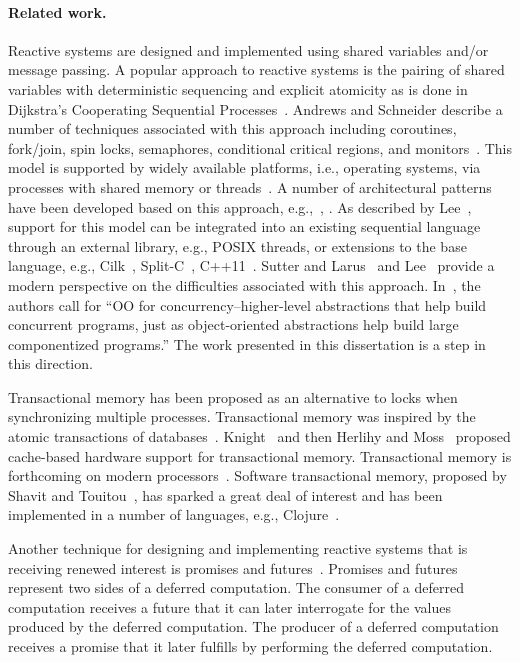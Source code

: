\paragraph{Related work.}
Reactive systems are designed and implemented using shared variables and/or message passing.
A popular approach to reactive systems is the pairing of shared variables with deterministic sequencing and explicit atomicity as is done in Dijkstra's Cooperating Sequential Processes~\cite{dijkstra1965cooperating}.
Andrews and Schneider describe a number of techniques associated with this approach including coroutines, fork/join, spin locks, semaphores, conditional critical regions, and monitors~\cite{andrews1983concepts}.
This model is supported by widely available platforms, i.e., operating systems, via processes with shared memory or threads~\cite{silberschatz2005operating}.
A number of architectural patterns have been developed based on this approach, e.g.,~\cite{schmidt2000pattern}, \cite{lea2000concurrent}.
As described by Lee~\cite{lee2006problem}, support for this model can be integrated into an existing sequential language through an external library, e.g., POSIX threads, or extensions to the base language, e.g., Cilk~\cite{blumofe1995cilk}, Split-C~\cite{culler1993parallel}, C++11~\cite{cxx11}.
Sutter and Larus~\cite{sutter2005software} and Lee~\cite{lee2006problem} provide a modern perspective on the difficulties associated with this approach.
In~\cite{sutter2005software}, the authors call for ``OO for concurrency--higher-level abstractions that help build concurrent programs, just as object-oriented abstractions help build large componentized programs.''
The work presented in this dissertation is a step in this direction.

Transactional memory has been proposed as an alternative to locks when synchronizing multiple processes.
Transactional memory was inspired by the atomic transactions of databases~\cite{Eswaran:1976:NCP:360363.360369}.
Knight~\cite{Knight:1986:AMF:319838.319854} and then Herlihy and Moss~\cite{Herlihy:1993:TMA:165123.165164} proposed cache-based hardware support for transactional memory.
Transactional memory is forthcoming on modern processors~\cite{haswell}.
Software transactional memory, proposed by Shavit and Touitou~\cite{shavit1997software}, has sparked a great deal of interest and has been implemented in a number of languages, e.g., Clojure~\cite{halloway2009programming}.

Another technique for designing and implementing reactive systems that is receiving renewed interest is promises and futures~\cite{friedman1976impact, ifip1975new}.
Promises and futures represent two sides of a deferred computation.
The consumer of a deferred computation receives a future that it can later interrogate for the values produced by the deferred computation.
The producer of a deferred computation receives a promise that it later fulfills by performing the deferred computation.


